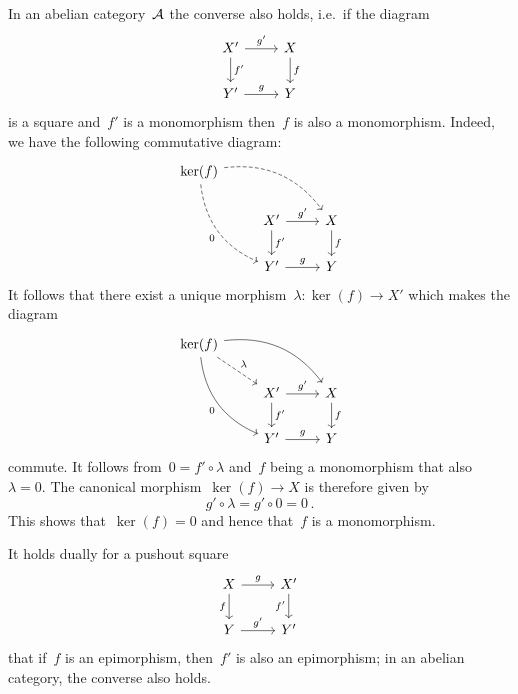 \begin{remark}
  In an abelian category~$\mathcal{A}$ the converse also holds, i.e.\ if the diagram
  \[
    \begin{tikzcd}
        X'
        \arrow{r}[above]{g'}
        \arrow{d}[right]{f'}
      & X
        \arrow{d}[right]{f}
      \\
        Y'
        \arrow{r}[above]{g}
      & Y
    \end{tikzcd}
  \]
  is a {\pb} square and~$f'$ is a monomorphism then~$f$ is also a monomorphism.
  Indeed, we have the following commutative diagram:
  \[
    \begin{tikzcd}
        \ker(f)
        \arrow[dashed,bend left]{drr}
        \arrow[dashed,bend right]{ddr}[below left]{0}
      & {}
      & {}
    \\
        {}
      & X'
        \arrow{r}[above]{g'}
        \arrow{d}[right]{f'}
      & X
        \arrow{d}[right]{f}
      \\
        {}
      & Y'
        \arrow{r}[above]{g}
      & Y
    \end{tikzcd}
  \]
  It follows that there exist a unique morphism~$\lambda \colon \ker(f) \to X'$ which makes the diagram
  \[
    \begin{tikzcd}
        \ker(f)
        \arrow[bend left]{drr}
        \arrow[dashed]{dr}[above right]{\lambda}
        \arrow[bend right]{ddr}[below left]{0}
      & {}
      & {}
    \\
        {}
      & X'
        \arrow{r}[above]{g'}
        \arrow{d}[right]{f'}
      & X
        \arrow{d}[right]{f}
      \\
        {}
      & Y'
        \arrow{r}[above]{g}
      & Y
    \end{tikzcd}
  \]
  commute.
  It follows from~$0 = f' \circ \lambda$ and~$f$ being a monomorphism that also~$\lambda = 0$.
  The canonical morphism~$\ker(f) \to X$ is therefore given by
  \[
      g' \circ \lambda
    = g' \circ 0
    = 0 \,.
  \]
  This shows that~$\ker(f) = 0$ and hence that~$f$ is a monomorphism.
\end{remark}


\begin{remark}
  \label{pushouts and epis}
  It holds dually for a pushout square
  \[
    \begin{tikzcd}
        X
        \arrow{r}[above]{g}
        \arrow{d}[left]{f}
      & X'
        \arrow{d}[left]{f'}
      \\
        Y
        \arrow{r}[above]{g'}
      & Y'
    \end{tikzcd}
  \]
  that if~$f$ is an epimorphism, then~$f'$ is also an epimorphism;
  in an abelian category, the converse also holds.
\end{remark}



